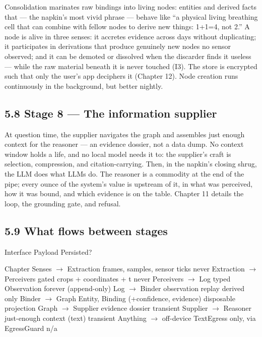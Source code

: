 Consolidation marinates raw bindings into living nodes: entities and derived facts that --- the napkin's most vivid phrase --- behave like ``a physical living breathing cell that can combine with fellow nodes to derive new things: 1+1=4, not 2.'' A node is alive in three senses: it accretes evidence across days without duplicating; it participates in derivations that produce genuinely new nodes no sensor observed; and it can be demoted or dissolved when the discarder finds it useless --- while the raw material beneath it is never touched (I3). The store is encrypted such that only the user's app deciphers it (Chapter 12). Node creation runs continuously in the background, but better nightly.

\subsection{5.8 Stage 8 --- The information supplier}\label{stage-8-the-information-supplier}

At question time, the supplier navigates the graph and assembles just enough context for the reasoner --- an evidence dossier, not a data dump. No context window holds a life, and no local model needs it to: the supplier's craft is selection, compression, and citation-carrying. Then, in the napkin's closing shrug, the LLM does what LLMs do. The reasoner is a commodity at the end of the pipe; every ounce of the system's value is upstream of it, in what was perceived, how it was bound, and which evidence is on the table. Chapter 11 details the loop, the grounding gate, and refusal.

\subsection{5.9 What flows between stages}\label{what-flows-between-stages}

Interface Payload Persisted?

Chapter Senses \(\rightarrow\) Extraction frames, samples, sensor ticks never Extraction \(\rightarrow\) Perceivers gated crops + coordinates + t never Perceivers \(\rightarrow\) Log typed Observation forever (append-only) Log \(\rightarrow\) Binder observation replay derived only Binder \(\rightarrow\) Graph Entity, Binding (+confidence, evidence) disposable projection Graph \(\rightarrow\) Supplier evidence dossier transient Supplier \(\rightarrow\) Reasoner just-enough context (text) transient Anything \(\rightarrow\) off-device TextEgress only, via EgressGuard n/a

